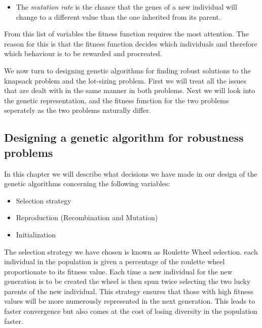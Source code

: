 \begin{itemize}
\item The \emph{mutation rate} is the chance that the genes of a new
  individual will change to a different value than the one inherited
  from its parent.

\end{itemize}

From this list of variables the fitness function requires the most
attention. The reason for this is that the fitness function decides
which individuals and therefore which behaviour is to be rewarded and
procreated. 

We now turn to designing genetic algorithms for finding robust
solutions to the knapsack problem and the lot-sizing problem. First we
will treat all the issues that are dealt with in the same manner in
both problems. Next we will look into the genetic representation, and
the fitness function for the two problems seperately as the two
problems naturally differ.

\subsection{Designing a genetic algorithm for robustness problems}
\label{sec:ga_robustness}
In this chapter we will describe what decisions we have made in our
design of the genetic algorithms concerning the following variables:

\begin{itemize}
\item Selection strategy
\item Reproduction (Recombination and Mutation)
\item Initialization
\end{itemize}

The selection strategy we have chosen is known as Roulette Wheel
selection. each individual in the population is given a percentage of
the roulette wheel proportionate to its fitness value. Each time a new
individual for the new generation is to be created the wheel is then
spun twice selecting the two lucky parents of the new individual. This
strategy ensures that those with high fitness values will be more
numerously represented in the next generation. This leads to faster
convergence but also comes at the cost of losing diversity in the
population faster.


